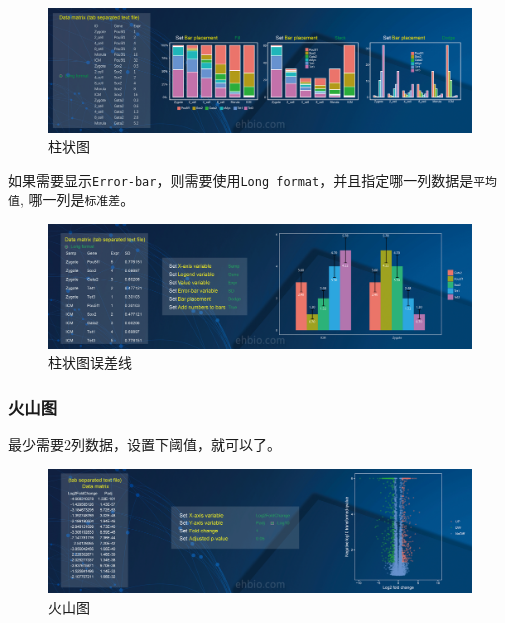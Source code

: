 \documentclass[]{article}
\numberwithin{figure}{section}
\numberwithin{table}{section}
\theoremstyle{definition}
\theoremstyle{definition}
\theoremstyle{definition}
\theoremstyle{remark}
\begin{document}
\begin{figure}[H]

{\centering \includegraphics[width=0.95\linewidth,height=0.7\textheight,keepaspectratio]{images/Barplot_2} 

}

\caption{柱状图}\label{fig:unnamed-chunk-257}
\end{figure}

如果需要显示\texttt{Error-bar}，则需要使用\texttt{Long\ format}，并且指定哪一列数据是\texttt{平均值},
哪一列是\texttt{标准差}。

\begin{figure}[H]

{\centering \includegraphics[width=0.95\linewidth,height=0.7\textheight,keepaspectratio]{images/Barplot_3} 

}

\caption{柱状图误差线}\label{fig:unnamed-chunk-258}
\end{figure}

\subsubsection{火山图}

最少需要2列数据，设置下阈值，就可以了。

\begin{figure}[H]

{\centering \includegraphics[width=0.95\linewidth,height=0.7\textheight,keepaspectratio]{images/Volcano_1} 

}

\caption{火山图}\label{fig:unnamed-chunk-259}
\end{figure}
\end{document}
